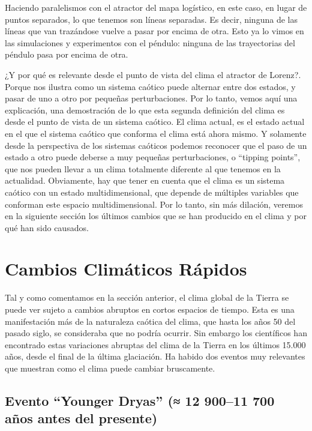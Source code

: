 \documentclass[
  11pt,
  a4paper,
  DIV=11,
  numbers=noendperiod]{scrreprt}
\begin{document}
Haciendo paralelismos con el atractor del mapa logístico, en este caso,
en lugar de puntos separados, lo que tenemos son líneas separadas. Es
decir, ninguna de las líneas que van trazándose vuelve a pasar por
encima de otra. Esto ya lo vimos en las simulaciones y experimentos con
el péndulo: ninguna de las trayectorias del péndulo pasa por encima de
otra.

¿Y por qué es relevante desde el punto de vista del clima el atractor de
Lorenz?. Porque nos ilustra como un sistema caótico puede alternar entre
dos estados, y pasar de uno a otro por pequeñas perturbaciones. Por lo
tanto, vemos aquí una explicación, una demostración de lo que esta
segunda definición del clima es desde el punto de vista de un sistema
caótico. El clima actual, es el estado actual en el que el sistema
caótico que conforma el clima está ahora mismo. Y solamente desde la
perspectiva de los sistemas caóticos podemos reconocer que el paso de un
estado a otro puede deberse a muy pequeñas perturbaciones, o ``tipping
points'', que nos pueden llevar a un clima totalmente diferente al que
tenemos en la actualidad. Obviamente, hay que tener en cuenta que el
clima es un sistema caótico con un estado multidimensional, que depende
de múltiples variables que conforman este espacio multidimensional. Por
lo tanto, sin más dilación, veremos en la siguiente sección los últimos
cambios que se han producido en el clima y por qué han sido causados.

\chapter{Cambios Climáticos
Rápidos}\label{cambios-climuxe1ticos-ruxe1pidos}

Tal y como comentamos en la sección anterior, el clima global de la
Tierra se puede ver sujeto a cambios abruptos en cortos espacios de
tiempo. Esta es una manifestación más de la naturaleza caótica del
clima, que hasta los años 50 del pasado siglo, se consideraba que no
podría ocurrir. Sin embargo los científicos han encontrado estas
variaciones abruptas del clima de la Tierra en los últimos 15.000 años,
desde el final de la última glaciación. Ha habido dos eventos muy
relevantes que muestran como el clima puede cambiar bruscamente.

\section{Evento ``Younger Dryas'' (≈ 12 900--11 700 años antes del
presente)}\label{evento-younger-dryas-12-90011-700-auxf1os-antes-del-presente}
\end{document}

